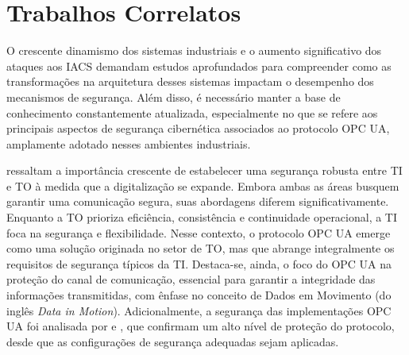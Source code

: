         

\section{Trabalhos Correlatos} \label{sec:trabCorrelatos}

    O crescente dinamismo dos sistemas industriais e o aumento significativo dos ataques aos IACS demandam estudos aprofundados para compreender como as transformações na arquitetura desses sistemas impactam o desempenho dos mecanismos de segurança. Além disso, é necessário manter a base de conhecimento constantemente atualizada, especialmente no que se refere aos principais aspectos de segurança cibernética associados ao protocolo OPC UA, amplamente adotado nesses ambientes industriais.

     ressaltam a importância crescente de estabelecer uma segurança robusta entre TI e TO à medida que a digitalização se expande. Embora ambas as áreas busquem garantir uma comunicação segura, suas abordagens diferem significativamente. Enquanto a TO prioriza eficiência, consistência e continuidade operacional, a TI foca na segurança e flexibilidade. Nesse contexto, o protocolo OPC UA emerge como uma solução originada no setor de TO, mas que abrange integralmente os requisitos de segurança típicos da TI. Destaca-se, ainda, o foco do OPC UA na proteção do canal de comunicação, essencial para garantir a integridade das informações transmitidas, com ênfase no conceito de Dados em Movimento (do inglês \textit{Data in Motion}). Adicionalmente, a segurança das implementações OPC UA foi analisada por  e , que confirmam um alto nível de proteção do protocolo, desde que as configurações de segurança adequadas sejam aplicadas.
    

